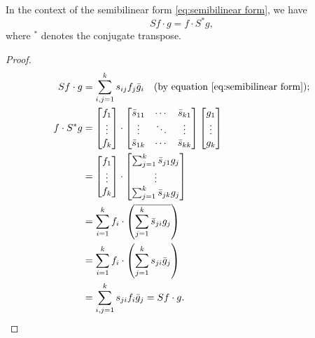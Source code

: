 \documentclass[12pt, oneside, a4paper]{article}
\begin{document}
\begin{prop}\cite[p.287]{CoddingtonLevinson}
    In the context of the semibilinear form \eqref{eq:semibilinear form}, we have
    \begin{equation}\label{eq:semibilinear adjoint}
        Sf\cdot g = f\cdot S^*g, 
    \end{equation}
    where $^*$ denotes the conjugate transpose.
\end{prop}
\begin{proof}
    \begin{align*}
        Sf\cdot g &= \sum_{i,j=1}^k s_{ij}f_j\bar{g}_i \quad\mbox{(by equation \eqref{eq:semibilinear form})};\\
        f\cdot S^*g &= \begin{bmatrix}
            f_1\\
            \vdots\\
            f_k
        \end{bmatrix}\cdot \begin{bmatrix}
            \bar{s}_{11} & \cdots & \bar{s}_{k1}\\
            \vdots & \ddots & \vdots\\
            \bar{s}_{1k} & \cdots & \bar{s}_{kk}
        \end{bmatrix} \begin{bmatrix}
            g_1\\
            \vdots\\
            g_k
        \end{bmatrix}\\
        &= \begin{bmatrix}
            f_1\\
            \vdots\\
            f_k
        \end{bmatrix}\cdot \begin{bmatrix}
            \sum_{j=1}^k \bar{s}_{j1}g_j\\
            \vdots\\
            \sum_{j=1}^k \bar{s}_{jk}g_j
        \end{bmatrix}\\
        &= \sum_{i=1}^k f_i\cdot \left(\overline{\sum_{j=1}^k\bar{s}_{ji}g_j}\right)\\
        &= \sum_{i=1}^k f_i\cdot \left(\sum_{j=1}^k s_{ji}\bar{g}_j\right)\\
        &= \sum_{i,j=1}^k s_{ji}f_i\bar{g}_j = Sf\cdot g.\qedhere
    \end{align*}
\end{proof}
\end{document}
